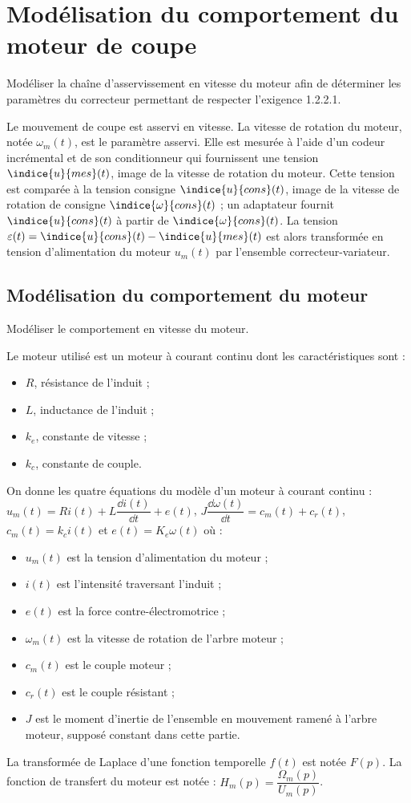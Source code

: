 \section{Modélisation du comportement du moteur de coupe}
\begin{obj}
Modéliser la chaîne d’asservissement en vitesse du moteur afin de déterminer les paramètres du correcteur permettant de respecter l’exigence 1.2.2.1.
\end{obj}


Le mouvement de coupe est asservi en vitesse. La vitesse de rotation du moteur, notée $\omega_m (t)$, est le paramètre asservi. Elle est mesurée à l’aide d’un codeur incrémental et de son conditionneur qui fournissent une tension $\indice{u}{mes}(t)$, image de la vitesse de rotation du moteur. Cette tension est comparée à la tension consigne $\indice{u}{cons} (t)$, image de la vitesse de rotation de consigne $\indice{\omega}{cons} (t)$ ; un adaptateur fournit $\indice{u}{cons}(t)$ à partir de $\indice{\omega}{cons} (t)$. La tension $\varepsilon(t)=\indice{u}{cons}(t) - \indice{u}{mes}(t)$ est alors transformée en tension d’alimentation du moteur $u_m (t)$ par l’ensemble correcteur-variateur.



\subsection*{Modélisation du comportement du moteur}
\begin{obj}
Modéliser le comportement en vitesse du moteur.
\end{obj}


Le moteur utilisé est un moteur à courant continu dont les caractéristiques sont :
\begin{itemize}
\item $R$, résistance de l’induit ;
\item $L$, inductance de l’induit ;
\item $k_e$, constante de vitesse ;
\item $k_c$, constante de couple.
\end{itemize}
On donne les quatre équations du modèle d’un moteur à courant continu :
$u_m (t)=R i(t)+L \dfrac{\dd i(t)}{\dd t}+e(t)$, $J \dfrac{\dd \omega(t)}{\dd t}=c_m (t)+c_r (t)$, $c_m (t)=k_c i(t)$ et $e(t)=K_e \omega(t)$ où :
\begin{itemize}
\item $u_m (t)$ est la tension d’alimentation du moteur ;
\item $i(t)$ est l’intensité traversant l’induit ;
\item $e(t)$ est la force contre-électromotrice ;
\item $\omega_m (t)$ est la vitesse de rotation de l’arbre moteur ;
\item $c_m (t)$ est le couple moteur ;
\item $c_r (t)$ est le couple résistant ;
\item $J$ est le moment d’inertie de l’ensemble en mouvement ramené à l’arbre moteur, supposé constant dans cette partie.
\end{itemize}

La transformée de Laplace d’une fonction temporelle $f(t)$ est notée $F(p)$.
La fonction de transfert du moteur est notée : $H_m (p)= \dfrac{\Omega_m (p)}{U_m (p)}$.


